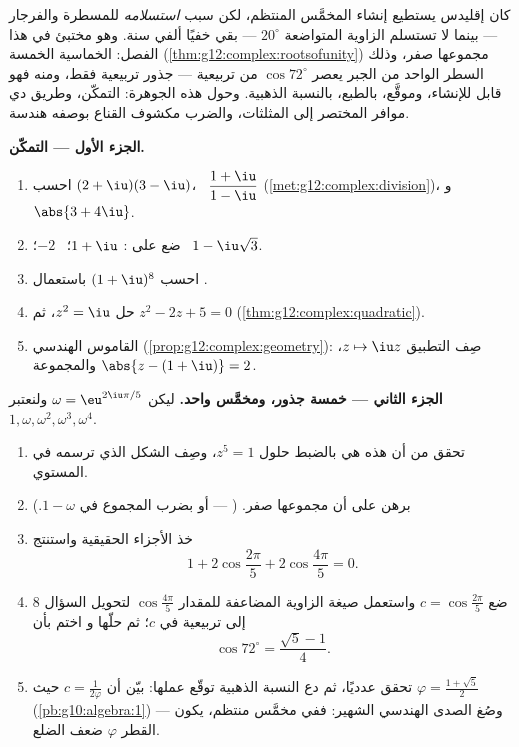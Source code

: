 \begin{problem}
\label{pb:g12:complex:1}
كان إقليدس يستطيع إنشاء المخمَّس المنتظم، لكن سبب
\emph{استسلامه} للمسطرة والفرجار --- بينما لا تستسلم
الزاوية المتواضعة $20^\circ$ --- بقي خفيًا ألفي
سنة. وهو مختبئ في هذا الفصل:  الخماسية الخمسة
(\cref{thm:g12:complex:rootsofunity}) مجموعها صفر، وذلك السطر
الواحد من الجبر يعصر $\cos 72^\circ$ من 
تربيعية --- جذور تربيعية فقط، ومنه فهو قابل للإنشاء، وموقَّع،
بالطبع، بالنسبة الذهبية. وحول هذه الجوهرة: التمكّن، وطريق
دي موافر المختصر إلى المثلثات، والضرب مكشوف القناع بوصفه
هندسة.

\medskip
\noindent\textbf{الجزء الأول --- التمكّن.}
\begin{enumerate}
  \item احسب $(2 + \iu)(3 - \iu)$، \
        $\dfrac{1 + \iu}{1 - \iu}$
        (\cref{met:g12:complex:division})، و
        $\abs{3 + 4\iu}$.
  \item ضع على : $1 + \iu$؛ \ $-2$؛ \
        $1 - \iu\sqrt3$.
  \item احسب $(1 + \iu)^8$ باستعمال \omterm{def:g12:complex:argument}{الصورة الأسية}.
  \item حل $z^2 = \iu$، ثم $z^2 - 2z + 5 = 0$
        (\cref{thm:g12:complex:quadratic}).
  \item القاموس الهندسي
        (\cref{prop:g12:complex:geometry}): صِف التطبيق
        $z \mapsto \iu z$، والمجموعة
        $\abs{z - (1 + \iu)} = 2$.
\end{enumerate}

\medskip
\noindent\textbf{الجزء الثاني --- خمسة جذور، ومخمَّس واحد.}
ليكن $\omega = \eu^{2\iu\pi/5}$ ولنعتبر
$1, \omega, \omega^2, \omega^3, \omega^4$.
\begin{enumerate}[resume]
  \item تحقق من أن هذه هي بالضبط حلول $z^5 = 1$،
        وصِف الشكل الذي ترسمه في المستوي.
  \item برهن على أن مجموعها صفر. (
        --- أو بضرب المجموع في $1 - \omega$.)
  \item خذ الأجزاء الحقيقية واستنتج
        \[
        1 + 2\cos\frac{2\pi}{5} + 2\cos\frac{4\pi}{5} = 0 .
        \]
  \item ضع $c = \cos\frac{2\pi}{5}$ واستعمل صيغة الزاوية المضاعفة
        للمقدار $\cos\frac{4\pi}{5}$ لتحويل السؤال 8
        إلى \omterm{def:g10:algebra:equation}{معادلة} تربيعية في $c$؛ ثم حلّها و
        اختم بأن
        \[
        \cos 72^\circ = \frac{\sqrt5 - 1}{4} .
        \]
  \item تحقق عدديًا، ثم دع النسبة الذهبية توقّع
        عملها: بيّن أن $c = \frac{1}{2\varphi}$ حيث
        $\varphi = \frac{1 + \sqrt5}{2}$
        (\cref{pb:g10:algebra:1}) --- وصُغ الصدى الهندسي
        الشهير: ففي مخمَّس منتظم، يكون القطر
        $\varphi$ ضعف الضلع.
\end{enumerate}


\end{problem}
